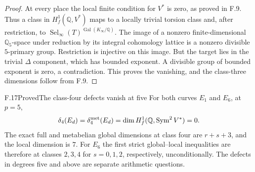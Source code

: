 \begin{proof}
At every place the local finite condition for $V^*$ is zero,
as proved in F.9. Thus a class in $H_f^1(\mathbb Q,V^*)$
maps to a locally trivial torsion class and, after restriction,
to $\operatorname{Sel}_\infty(T)^{\operatorname{Gal}(K_\infty/\mathbb Q)}$.
The image of a nonzero finite-dimensional $\mathbb Q_5$-space
under reduction by its integral cohomology lattice is a nonzero
divisible $5$-primary group. Restriction is injective on this image.
But the target lies in the trivial $\Delta$ component, which
has bounded exponent. A divisible group of bounded exponent is
zero, a contradiction. This proves the vanishing, and the
class-three dimensions follow from F.9.
\end{proof}

\begin{statement}{F.17}{Proved}{The class-four defects vanish at five}
For both curves $E_1$ and $E_6$, at $p=5$,
\[
 \delta_4(E_d)=\delta_4^{\rm met}(E_d)
 =\dim H_f^1(\mathbb Q,\operatorname{Sym}^2V^*)=0.
\]
The exact full and metabelian global dimensions at class four are
$r+s+3$, and the local dimension is $7$.
For $E_6$ the first strict global--local inequalities are therefore
at classes $2,3,4$ for $s=0,1,2$, respectively, unconditionally.
The defects in degrees five and above are separate arithmetic questions.
\end{statement}


